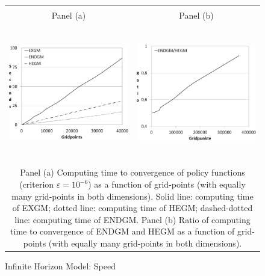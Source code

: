 \documentclass[a4paper,12pt]{article}%
\begin{document}
\begin{figure}[htb] \centering
\caption{Infinite Horizon Model: Speed}
\begin{tabular}
[c]{cc}
& \\
Panel (a) & Panel (b)\\
{\includegraphics[height=6.0cm, width=6.0cm]{Abbildungen/speed_all_finite_smart.eps}} & {\includegraphics[height=6.0cm, width=6.0cm]{Abbildungen/rel_endgm_HEgm_infinite_smart.eps}} \\
\multicolumn{2}{p{15cm}}{{\footnotesize Panel (a) Computing time to convergence of policy functions (criterion $\varepsilon=10^{-6}$) as a function of grid-points (with equally many grid-points in both dimensions). Solid line: computing time of EXGM; dotted line: computing time of HEGM; dashed-dotted line: computing time of ENDGM. Panel (b) Ratio of computing time to convergence of ENDGM and HEGM as a function of grid-points (with equally many grid-points in both dimensions).}}
\end{tabular}
\label{graph_infinte}
\end{figure}
\end{document}
